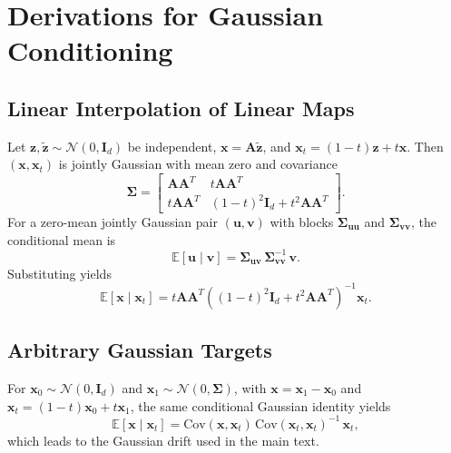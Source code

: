 \section{Derivations for Gaussian Conditioning}
\label{app:derivations}

\subsection{Linear Interpolation of Linear Maps}
Let $\mathbf z, \tilde{\mathbf z} \sim \mathcal{N}(0, \mathbf{I}_d)$ be independent, $\mathbf x = \mathbf A \tilde{\mathbf z}$, and $\mathbf x_t = (1-t)\mathbf z + t \mathbf x$. Then $(\mathbf x, \mathbf x_t)$ is jointly Gaussian with mean zero and covariance
\begin{equation*}
\boldsymbol \Sigma = \begin{bmatrix}
\mathbf A\mathbf A^T & t\mathbf A\mathbf A^T \\
 t\mathbf A\mathbf A^T & (1-t)^2 \mathbf I_d + t^2 \mathbf A\mathbf A^T
\end{bmatrix}.
\end{equation*}
For a zero-mean jointly Gaussian pair $(\mathbf u, \mathbf v)$ with blocks $\boldsymbol \Sigma_{\mathbf u\mathbf u}$ and $\boldsymbol \Sigma_{\mathbf v\mathbf v}$, the conditional mean is
\begin{equation*}
\mathbb{E}[\mathbf u\mid \mathbf v] = \boldsymbol \Sigma_{\mathbf u\mathbf v}\,\boldsymbol \Sigma_{\mathbf v\mathbf v}^{-1}\,\mathbf v.
\end{equation*}
Substituting yields
\begin{equation*}
\mathbb{E}[\mathbf x\mid \mathbf x_t] = t \mathbf A\mathbf A^T \left((1-t)^2 \mathbf I_d + t^2 \mathbf A\mathbf A^T\right)^{-1}\mathbf x_t.
\end{equation*}

\subsection{Arbitrary Gaussian Targets}
For $\mathbf{x}_0 \sim \mathcal{N}(0,\mathbf I_d)$ and $\mathbf{x}_1 \sim \mathcal{N}(0,\boldsymbol\Sigma)$, with $\mathbf{x} = \mathbf{x}_1-\mathbf{x}_0$ and $\mathbf{x}_t=(1-t)\mathbf{x}_0+t\mathbf{x}_1$, the same conditional Gaussian identity yields
\begin{equation*}
\mathbb{E}[\mathbf x\mid \mathbf x_t] = \mathrm{Cov}(\mathbf x,\mathbf x_t)\,\mathrm{Cov}(\mathbf x_t,\mathbf x_t)^{-1}\,\mathbf x_t,
\end{equation*}
which leads to the Gaussian drift used in the main text.

